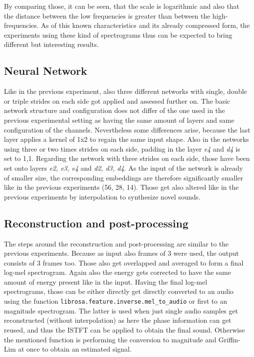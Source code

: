 By comparing those, it can be seen, that the scale is logarithmic and also that the distance between the low frequencies is greater than between the high-frequencies. As of this known characteristics and its already compressed form, the experiments using these kind of spectrograms thus can be expected to bring different but interesting results. 

\subsection{Neural Network}
Like in the previous experiment, also three different networks with single, double or triple strides on each side got applied and assessed further on. The basic network structure and configuration does not differ of the one used in the previous experimental setting as having the same amount of layers and same configuration of the channels. Nevertheless some differences arise, because the last layer applies a kernel of 1x2 to regain the same input shape. Also in the networks using three or two times strides on each side, padding in the layer \textit{e4} and \textit{d4} is set to 1,1. Regarding the network with three strides on each side, those have been set onto layers \textit{e2, e3, e4} and \textit{d2, d3, d4}. As the input of the network is already of smaller size, the corresponding embeddings are therefore significantly smaller like in the previous experiments (56, 28, 14). Those get also altered like in the previous experiments by interpolation to synthesize novel sounds. 

\subsection{Reconstruction and post-processing}
The steps around the reconstruction and post-processing are similar to the previous experiments. Because as input also frames of 3 were used, the output consists of 3 frames too. Those also get overlapped and averaged to form a final log-mel spectrogram. Again also the energy gets corrected to have the same amount of energy present like in the input. Having the final log-mel spectrograms, those can be either directly get directly converted to an audio using the function \texttt{librosa.feature.inverse.mel\_to\_audio} or first to an magnitude spectrogram. The latter is used when just single audio samples get reconstructed (without interpolation) as here the phase information can get reused, and thus the ISTFT can be applied to obtain the final sound. Otherwise the mentioned function is performing the conversion to magnitude and Griffin-Lim at once to obtain an estimated signal. 


